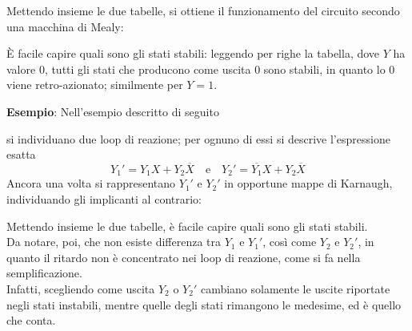 \documentclass[a4paper]{extarticle}
\begin{document}
\vspace{1em}
\noindent
Mettendo insieme le due tabelle, si ottiene il funzionamento del circuito secondo una macchina di Mealy:

\vspace{1em}
\noindent
È facile capire quali sono gli stati stabili: leggendo per righe la tabella, dove $Y$ ha valore $0$, tutti gli stati che producono come uscita $0$ sono stabili, in quanto lo $0$ viene retro-azionato; similmente per $Y=1$.

\vspace{2em}
\noindent
\textbf{Esempio}: Nell'esempio descritto di seguito

\vspace{1em}
\noindent
si individuano due loop di reazione; per ognuno di essi si descrive l'espressione esatta
\[Y_1'=Y_1X + Y_2 \overline{X} \hspace{1em} \text{e} \hspace{1em} Y_2'=\overline{Y_1}X + Y_2 \overline{X}\]
Ancora una volta si rappresentano $Y_1'$ e $Y_2'$ in opportune mappe di Karnaugh, individuando gli implicanti al contrario:

\vspace{1em}
\noindent
Mettendo insieme le due tabelle, è facile capire quali sono gli stati stabili.\\
Da notare, poi, che non esiste differenza tra $Y_1$ e $Y_1'$, così come $Y_2$ e $Y_2'$, in quanto il ritardo non è concentrato nei loop di reazione, come si fa nella semplificazione.\\
Infatti, scegliendo come uscita $Y_2$ o $Y_2'$ cambiano solamente le uscite riportate negli stati instabili, mentre quelle degli stati rimangono le medesime, ed è quello che conta.
\end{document}
